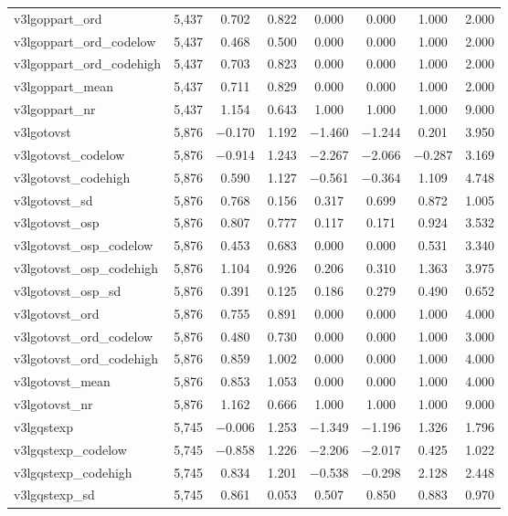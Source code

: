 \begin{table}[!htbp]
\begin{tabular}{@{\extracolsep{5pt}}lccccccc}
v3lgoppart\_ord & 5,437 & 0.702 & 0.822 & 0.000 & 0.000 & 1.000 & 2.000 \\ 
v3lgoppart\_ord\_codelow & 5,437 & 0.468 & 0.500 & 0.000 & 0.000 & 1.000 & 2.000 \\ 
v3lgoppart\_ord\_codehigh & 5,437 & 0.703 & 0.823 & 0.000 & 0.000 & 1.000 & 2.000 \\ 
v3lgoppart\_mean & 5,437 & 0.711 & 0.829 & 0.000 & 0.000 & 1.000 & 2.000 \\ 
v3lgoppart\_nr & 5,437 & 1.154 & 0.643 & 1.000 & 1.000 & 1.000 & 9.000 \\ 
v3lgotovst & 5,876 & $-$0.170 & 1.192 & $-$1.460 & $-$1.244 & 0.201 & 3.950 \\ 
v3lgotovst\_codelow & 5,876 & $-$0.914 & 1.243 & $-$2.267 & $-$2.066 & $-$0.287 & 3.169 \\ 
v3lgotovst\_codehigh & 5,876 & 0.590 & 1.127 & $-$0.561 & $-$0.364 & 1.109 & 4.748 \\ 
v3lgotovst\_sd & 5,876 & 0.768 & 0.156 & 0.317 & 0.699 & 0.872 & 1.005 \\ 
v3lgotovst\_osp & 5,876 & 0.807 & 0.777 & 0.117 & 0.171 & 0.924 & 3.532 \\ 
v3lgotovst\_osp\_codelow & 5,876 & 0.453 & 0.683 & 0.000 & 0.000 & 0.531 & 3.340 \\ 
v3lgotovst\_osp\_codehigh & 5,876 & 1.104 & 0.926 & 0.206 & 0.310 & 1.363 & 3.975 \\ 
v3lgotovst\_osp\_sd & 5,876 & 0.391 & 0.125 & 0.186 & 0.279 & 0.490 & 0.652 \\ 
v3lgotovst\_ord & 5,876 & 0.755 & 0.891 & 0.000 & 0.000 & 1.000 & 4.000 \\ 
v3lgotovst\_ord\_codelow & 5,876 & 0.480 & 0.730 & 0.000 & 0.000 & 1.000 & 3.000 \\ 
v3lgotovst\_ord\_codehigh & 5,876 & 0.859 & 1.002 & 0.000 & 0.000 & 1.000 & 4.000 \\ 
v3lgotovst\_mean & 5,876 & 0.853 & 1.053 & 0.000 & 0.000 & 1.000 & 4.000 \\ 
v3lgotovst\_nr & 5,876 & 1.162 & 0.666 & 1.000 & 1.000 & 1.000 & 9.000 \\ 
v3lgqstexp & 5,745 & $-$0.006 & 1.253 & $-$1.349 & $-$1.196 & 1.326 & 1.796 \\ 
v3lgqstexp\_codelow & 5,745 & $-$0.858 & 1.226 & $-$2.206 & $-$2.017 & 0.425 & 1.022 \\ 
v3lgqstexp\_codehigh & 5,745 & 0.834 & 1.201 & $-$0.538 & $-$0.298 & 2.128 & 2.448 \\ 
v3lgqstexp\_sd & 5,745 & 0.861 & 0.053 & 0.507 & 0.850 & 0.883 & 0.970 \\ 

\end{tabular}
\end{table}
